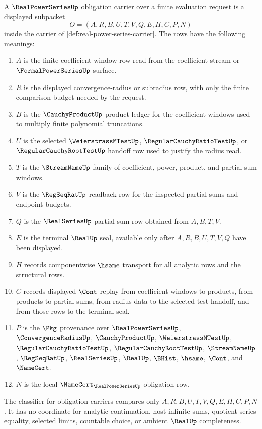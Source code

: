 \begin{definition}
\label{def:real-power-series-obligation-carrier}
A $\RealPowerSeriesUp$ obligation carrier over a finite evaluation request is a displayed subpacket
$$
O=(A,R,B,U,T,V,Q,E,H,C,P,N)
$$
inside the carrier of \autoref{def:real-power-series-carrier}. The rows have the following meanings:
\begin{enumerate}
\item $A$ is the finite coefficient-window row read from the coefficient stream or $\FormalPowerSeriesUp$ surface.
\item $R$ is the displayed convergence-radius or subradius row, with only the finite comparison budget needed by the request.
\item $B$ is the $\CauchyProductUp$ product ledger for the coefficient windows used to multiply finite polynomial truncations.
\item $U$ is the selected $\WeierstrassMTestUp$, $\RegularCauchyRatioTestUp$, or $\RegularCauchyRootTestUp$ handoff row used to justify the radius read.
\item $T$ is the $\StreamNameUp$ family of coefficient, power, product, and partial-sum windows.
\item $V$ is the $\RegSeqRatUp$ readback row for the inspected partial sums and endpoint budgets.
\item $Q$ is the $\RealSeriesUp$ partial-sum row obtained from $A,B,T,V$.
\item $E$ is the terminal $\RealUp$ seal, available only after $A,R,B,U,T,V,Q$ have been displayed.
\item $H$ records componentwise $\hsame$ transport for all analytic rows and the structural rows.
\item $C$ records displayed $\Cont$ replay from coefficient windows to products, from products to partial sums, from radius data to the selected test handoff, and from those rows to the terminal seal.
\item $P$ is the $\Pkg$ provenance over $\RealPowerSeriesUp$, $\ConvergenceRadiusUp$, $\CauchyProductUp$, $\WeierstrassMTestUp$, $\RegularCauchyRatioTestUp$, $\RegularCauchyRootTestUp$, $\StreamNameUp$, $\RegSeqRatUp$, $\RealSeriesUp$, $\RealUp$, $\BHist$, $\hsame$, $\Cont$, and $\NameCert$.
\item $N$ is the local $\NameCert_{\RealPowerSeriesUp}$ obligation row.
\end{enumerate}
The classifier for obligation carriers compares only $A,R,B,U,T,V,Q,E,H,C,P,N$. It has no coordinate for analytic continuation, host infinite sums, quotient series equality, selected limits, countable choice, or ambient $\RealUp$ completeness.
\end{definition}

